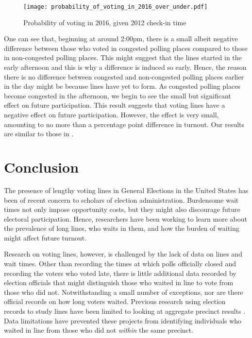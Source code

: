 \documentclass[12pt,titlepage]{article}
\begin{document}
\begin{figure}[!ht]
\caption{Probability of voting in 2016, given 2012 check-in time}
  \label{fig:prvoting2016}
  \centering
    \centering\texttt{[image: probability\_of\_voting\_in\_2016\_over\_under.pdf]}
\end{figure}

One can see that, beginning at around 2:00pm, there is a small albeit
negative difference between those who voted in congested polling
places compared to those in non-congested polling places.  This might
suggest that the lines started in the early afternoon and this is why
a difference is induced so early.  Hence, the reason there is no
difference between congested and non-congested polling places earlier
in the day might be because lines have yet to form. As congested
polling places become congested in the afternoon, we begin to see the
small but significant effect on future participation.  This result
suggests that voting lines have a negative effect on future
participation.  However, the effect is very small, amounting to no
more than a percentage point difference in turnout.  Our results are
similar to those in \citet{pettigrew:longlinesminorityprecincts}.

\section*{Conclusion}

The presence of lengthy voting lines in General Elections in the
United States has been of recent concern to scholars of election
administration. Burdensome wait times not only impose opportunity
costs, but they might also discourage future electoral participation.
Hence, researchers have been working to learn more about the
prevalence of long lines, who waits in them, and how the burden of
waiting might affect future turnout.

Research on voting lines, however, is challenged by the lack of data
on lines and wait times.  Other than recording the times at which
polls officially closed and recording the voters who voted late, there
is little additional data recorded by election officials that might
distinguish those who waited in line to vote from those who did not.
Notwithstanding a small number of exceptions, nor are there official
records on how long voters waited.  Previous research using election
records to study lines have been limited to looking at aggregate
precinct results \citep{herronsmith:closingtimes,
  pettigrew:longlinesminorityprecincts}.  Data limitations have
prevented these projects from identifying individuals who waited in
line from those who did not \emph{within} the same precinct.
\end{document}
